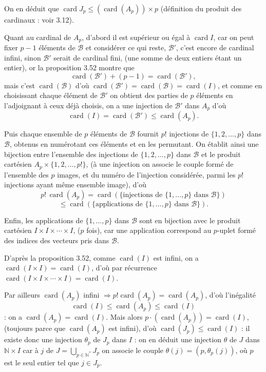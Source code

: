 On en déduit que $\operatorname{card}J_p\le(\operatorname{card}(A_p))\times p$ (définition du produit des cardinaux : voir 3.12).

Quant au cardinal de $A_p$, d'abord il est supérieur ou égal à $\operatorname{card}I$, car on peut fixer $p-1$ éléments de $\mathcal B$ et considérer ce qui reste, $\mathcal B'$, c'est encore de cardinal infini, sinon $\mathcal B'$ serait de cardinal fini, (une somme de deux entiers étant un entier), or la proposition 3.52 montre que
\[
\operatorname{card}(\mathcal B')+(p-1)=\operatorname{card}(\mathcal B'),
\]
mais c'est $\operatorname{card}(\mathcal B)$ d'où $\operatorname{card}(\mathcal B')=\operatorname{card}(\mathcal B)=\operatorname{card}(I)$, et comme en choisissant chaque élément de $\mathcal B'$ on obtient des parties de $p$ éléments en l'adjoignant à ceux déjà choisis, on a une injection de $\mathcal B'$ dans $A_p$ d'où
\[
\operatorname{card}(I)=\operatorname{card}(\mathcal B')\le\operatorname{card}(A_p).
\]

Puis chaque ensemble de $p$ éléments de $\mathcal B$ fournit $p!$ injections de $\{1,2,\ldots,p\}$ dans $\mathcal B$, obtenus en numérotant ces éléments et en les permutant. On établit ainsi une bijection entre l'ensemble des injections de $\{1,2,\ldots,p\}$ dans $\mathcal B$ et le produit cartésien $A_p\times\{1,2,\ldots,p!\}$, (à une injection on associe le couple formé de l'ensemble des $p$ images, et du numéro de l'injection considérée, parmi les $p!$ injections ayant même ensemble image), d'où
\[
p!\,\operatorname{card}(A_p)=\operatorname{card}(\{\text{injections de }\{1,\ldots,p\}\text{ dans }\mathcal B\})
\]
\[
\le\operatorname{card}(\{\text{applications de }\{1,\ldots,p\}\text{ dans }\mathcal B\}).
\]

Enfin, les applications de $\{1,\ldots,p\}$ dans $\mathcal B$ sont en bijection avec le produit cartésien $I\times I\times\cdots\times I$, ($p$ fois), car une application correspond au $p$-uplet formé des indices des vecteurs pris dans $\mathcal B$.

D'après la proposition 3.52, comme $\operatorname{card}(I)$ est infini, on a $\operatorname{card}(I\times I)=\operatorname{card}(I)$, d'où par récurrence $\operatorname{card}(I\times I\times\cdots\times I)=\operatorname{card}(I)$.

Par ailleurs $\operatorname{card}(A_p)$ infini $\Rightarrow p!\operatorname{card}(A_p)=\operatorname{card}(A_p)$, d'où l'inégalité
\[
\operatorname{card}(I)\le\operatorname{card}(A_p)\le\operatorname{card}(I)
\]
: on a $\operatorname{card}(A_p)=\operatorname{card}(I)$. Mais alors $p\cdot(\operatorname{card}(A_p))=\operatorname{card}(I)$, (toujours parce que $\operatorname{card}(A_p)$ est infini), d'où $\operatorname{card}(J_p)\le\operatorname{card}(I)$ : il existe donc une injection $\theta_p$ de $J_p$ dans $I$ : on en déduit une injection $\theta$ de $J$ dans $\mathbb N\times I$ car à $j$ de $J=\bigcup_{p\in\mathbb N^*}J_p$ on associe le couple $\theta(j)=(p,\theta_p(j))$, où $p$ est le seul entier tel que $j\in J_p$.


